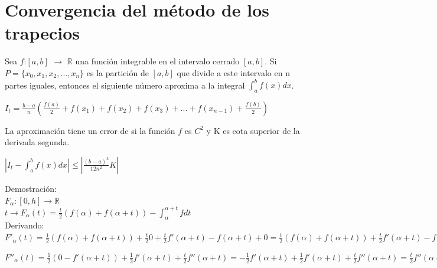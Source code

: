 \documentclass{beamer}
\begin{document}
\section{Convergencia del método de los trapecios}
\begin{frame}
\begin {theorem}
Sea $f$:$[a,b]$ $\rightarrow$ $\mathbb{R}$ una función integrable en el intervalo cerrado $[a,b]$. Si $P=\{x_0,x_1,x_2,...,x_n\}$ es la partición de $[a,b]$ que divide a este intervalo en n partes iguales, entonces el siguiente número aproxima a la integral $\int_a^bf(x)dx$.

$I_t= \frac{b-a}{n}\left( \frac{f(a)}{2} + f(x_1)+f(x_2)+f(x_3)+...+f(x_{n-1})+\frac{f(b)} {2} \right)$

La aproximación tiene un error de si la función $f$ es $C^2$ y K es cota superior de la derivada segunda.

$|I_t-\int_a^bf(x)dx|\leq |\frac {(b-a)^3} {12n^2} K|$
\end {theorem}
\end{frame}
\begin {frame}
Demostración:\\
$F_\alpha :[0,h]\rightarrow \mathbb{R}$\\
$t\rightarrow F_\alpha(t)=\frac{t}{2} \left(f(\alpha)+f(\alpha+t) \right)-\int_\alpha ^{\alpha+t} f dt$\\
\pause
Derivando:\\
$F'_\alpha(t)=\frac{1}{2}\left(f(\alpha)+f(\alpha+t) \right) +\frac{t}{2} 0 + \frac{t}{2} f'(\alpha+t)  -f(\alpha+t) +0=\frac{1}{2}\left(f(\alpha)+f(\alpha+t) \right)+ \frac{t}{2} f'(\alpha+t)  -f(\alpha+t)=\frac {1}{2} \left(f(\alpha)-f(\alpha+t) \right)+ \frac{t}{2} f'(\alpha+t)$\\
\pause

$F''_\alpha(t)=\frac {1}{2} \left(0-f'(\alpha+t) \right)+ \frac{1}{2} f'(\alpha+t)+\frac{t}{2}f''(\alpha+t)=-\frac {1}{2} f'(\alpha+t) + \frac{1}{2} f'(\alpha+t)+\frac{t}{2}f''(\alpha+t)=\frac{t}{2}f''(\alpha+t)$\\

\end{frame}
\end{document}
